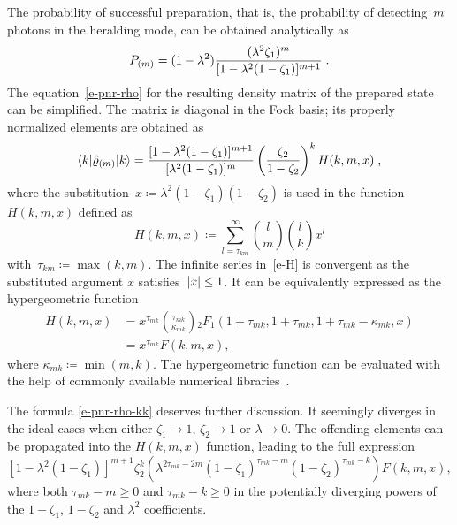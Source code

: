 \documentclass{article}
\begin{document}
The probability of successful preparation, that is, the probability of detecting~$m$ photons in the heralding mode, can be obtained analytically as
%
\begin{equation}\label{e-pnr-pro}
  P_{(m)} = (1 - \lambda^{2}) 
  \frac
    { (\lambda^{2} \zeta_{1})^{m} }
    { [ 1 - \lambda^{2} (1 - \zeta_{1}) ]^{m + 1} } \;\text{.}
\end{equation}
%
The equation~\eqref{e-pnr-rho} for the resulting density matrix of the prepared state can be simplified. The matrix is diagonal in the Fock basis; its properly normalized elements are obtained as
%
\begin{equation}\label{e-pnr-rho-kk}
  \braket{ k | \hat{\varrho}_{(m)} | k } =
  \frac
    { [ 1 - \lambda^{2} (1 - \zeta_{1}) ]^{m + 1} }
    { [ \lambda^{2} (1 - \zeta_{1}) ]^{m} }
  \left( \frac{ \zeta_{2} }{ 1 - \zeta_{2} } \right)^{k}
  H (k, m, x) \;\text{,}
\end{equation}
%
where the substitution~${x \coloneqq \lambda^{2} ( 1 - \zeta_{1} )(1 - \zeta_{2} )}$ is used in the function~$H(k, m, x)$ defined as
%
\begin{equation}\label{e-H}
  H(k, m, x) \coloneq
  \sum\limits_{l = \tau_{km}}^{\infty}
    \binom{l}{m}
    \binom{l}{k}
    x^{l} 
\end{equation}
%
with~${\tau_{km} \coloneqq \max(k, m)}$. The infinite series in~\eqref{e-H} is convergent as the substituted argument $x$ satisfies~${\lvert x \rvert \leq 1}$. It can be equivalently expressed as the hypergeometric function~\cite{bateman1981}
%
\begin{equation}
  \begin{aligned}
    H(k, m, x) & =
    x^{\tau_{mk}} 
    \binom
      {\tau_{mk}}
      {\kappa_{mk}}
    {}_{2}F_{1} (
      1 + \tau_{mk},
      1 + \tau_{mk},
      1 + \tau_{mk} - \kappa_{mk},
      x
    ) \\
    & =
    x^{\tau_{mk}} F(k, m, x),
  \end{aligned}
\end{equation}
%
where ${\kappa_{mk} \coloneqq \min (m, k)}$. The hypergeometric function can be evaluated with the help of commonly available numerical libraries~\cite{virtanen2020}. 

The formula \eqref{e-pnr-rho-kk} deserves further discussion. It seemingly diverges in the ideal cases when either ${\zeta_{1} \to 1}$, ${\zeta_{2} \to 1}$ or ${\lambda \to 0}$. The offending elements can be propagated into the $H(k, m, x)$ function, leading to the full expression
%
\begin{equation}
  { [ 1 - \lambda^{2} (1 - \zeta_{1}) ]^{m + 1} }
  { \zeta_{2}^{k} }
  \left(
    \lambda^{2 \tau_{mk} - 2m}
    (1 - \zeta_{1})^{\tau_{mk} - m}
    (1 - \zeta_{2})^{\tau_{mk} - k}
  \right)
  F (k, m, x),
\end{equation}
%
where both ${\tau_{mk} - m \geq 0}$ and ${\tau_{mk} - k \geq 0}$ in the potentially diverging powers of the ${1 - \zeta_{1}}$, ${1 - \zeta_{2}}$ and $\lambda^{2}$ coefficients.
\end{document}
